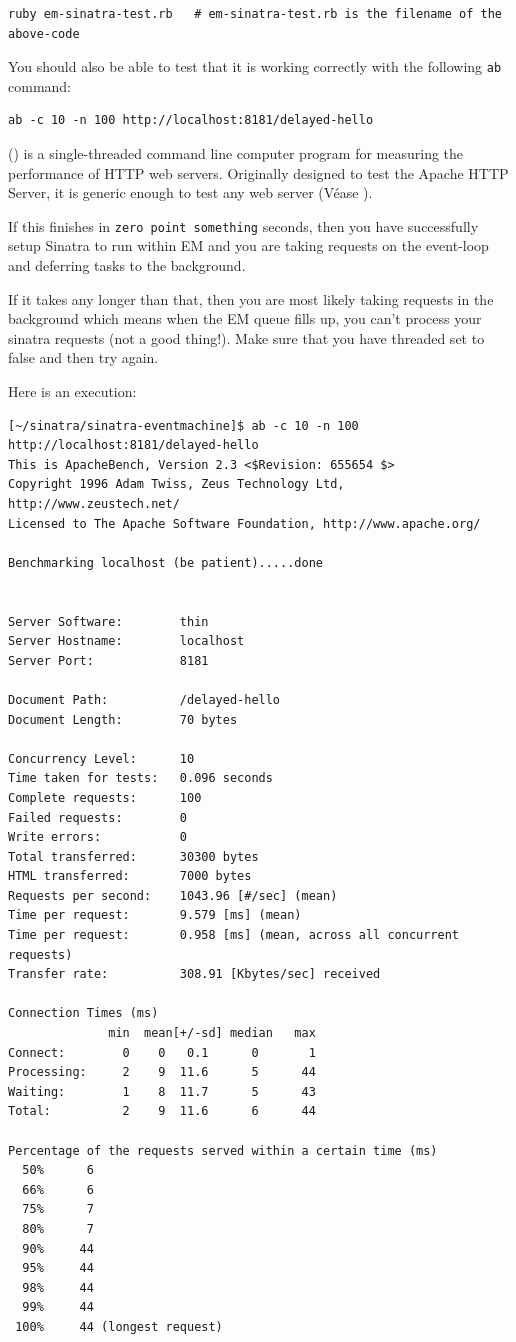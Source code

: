 \begin{verbatim}
ruby em-sinatra-test.rb   # em-sinatra-test.rb is the filename of the above-code
\end{verbatim}
You should also be able to test that it is working correctly with the following \verb|ab| 
command:

\begin{verbatim}
ab -c 10 -n 100 http://localhost:8181/delayed-hello
\end{verbatim}
 () is a single-threaded command line
computer program for measuring the performance of HTTP web servers.
Originally designed to test the Apache HTTP Server, it is generic
enough to test any web server (Véase 
).

If this finishes in \verb|zero point something| seconds, then you have
successfully setup Sinatra to run within EM and you are taking
requests on the event-loop and deferring tasks to the background.

If it takes any longer than that, then you are most likely taking
requests in the background which means when the EM queue fills up,
you can't process your sinatra requests (not a good thing!). Make
sure that you have threaded set to false and then try again.

Here is an execution:
\begin{verbatim}
[~/sinatra/sinatra-eventmachine]$ ab -c 10 -n 100 http://localhost:8181/delayed-hello
This is ApacheBench, Version 2.3 <$Revision: 655654 $>
Copyright 1996 Adam Twiss, Zeus Technology Ltd, http://www.zeustech.net/
Licensed to The Apache Software Foundation, http://www.apache.org/

Benchmarking localhost (be patient).....done


Server Software:        thin
Server Hostname:        localhost
Server Port:            8181

Document Path:          /delayed-hello
Document Length:        70 bytes

Concurrency Level:      10
Time taken for tests:   0.096 seconds
Complete requests:      100
Failed requests:        0
Write errors:           0
Total transferred:      30300 bytes
HTML transferred:       7000 bytes
Requests per second:    1043.96 [#/sec] (mean)
Time per request:       9.579 [ms] (mean)
Time per request:       0.958 [ms] (mean, across all concurrent requests)
Transfer rate:          308.91 [Kbytes/sec] received

Connection Times (ms)
              min  mean[+/-sd] median   max
Connect:        0    0   0.1      0       1
Processing:     2    9  11.6      5      44
Waiting:        1    8  11.7      5      43
Total:          2    9  11.6      6      44

Percentage of the requests served within a certain time (ms)
  50%      6
  66%      6
  75%      7
  80%      7
  90%     44
  95%     44
  98%     44
  99%     44
 100%     44 (longest request)
\end{verbatim}

